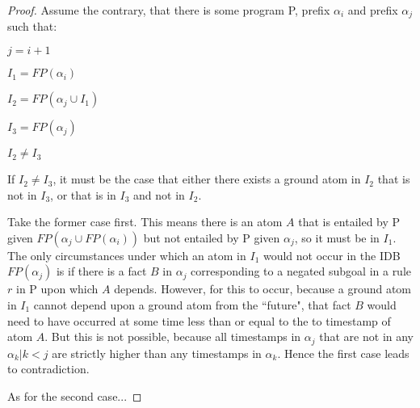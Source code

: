 \begin{proof}



Assume the contrary, that there is some program P, prefix $\alpha_i$ and prefix $\alpha_j$  such that:

$j = i + 1$

$I_1 = FP(\alpha_i)$

$I_2 = FP(\alpha_j \cup I_1)$

$I_3 = FP(\alpha_j)$

$I_2 \neq I_3$


If $I_2 \neq I_3$, it must be the case that either there exists a ground atom in $I_2$ that is not in $I_3$, or that is in
$I_3$ and not in $I_2$.  

Take the former case first.  This means there is an atom $A$ that is entailed by P given $FP(\alpha_{j} \cup FP(\alpha_{i}))$
but not entailed by P given $\alpha_{j}$, so it must be in $I_1$.   The only circumstances under which an atom in
$I_1$ would not occur in the IDB $FP(\alpha_{j})$ is if there is a fact $B$ in $\alpha_{j}$ 
corresponding to a negated subgoal in a rule $r$ in P upon which $A$ depends.  However, for this to occur, because a ground atom 
in $I_1$ cannot depend upon a ground atom from the ``future", that fact $B$ would need to have occurred at some time less than 
or equal to the to timestamp of atom $A$.  But this is not possible, because all timestamps in $\alpha_{j}$ that are not in any $\alpha_{k} | k<j$
are strictly higher than any timestamps in $\alpha_{k}$.  Hence the first case leads to contradiction.

As for the second case...

\end{proof}

